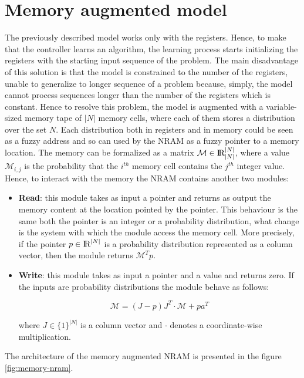 \section{Memory augmented model}\label{sec:nram-memory}
The previously described model works only with the registers. Hence, to make that the controller learns an algorithm, the learning process starts initializing the registers with the starting input sequence of the problem. The main disadvantage of this solution is that the model is constrained to the number of the registers, unable to generalize to longer sequence of a problem because, simply, the model cannot process sequences longer than the number of the registers which is constant.\newline\newline
Hence to resolve this problem, the model is augmented with a variable-sized memory tape of $|N|$ memory cells, where each of them stores a distribution over the set $N$. Each distribution both in registers and in memory could be seen as a fuzzy address and so can used by the NRAM as a fuzzy pointer to a memory location. The memory can be formalized as a matrix $\mathcal{M} \in \textrm{I\!R}_{|N|}^{|N|}$, where a value $\mathcal{M}_{i,j}$ is the probability that the $i^{th}$ memory cell contains the $j^{th}$ integer value.\newline\newline
Hence, to interact with the memory the NRAM contains another two modules:
\begin{itemize}
	\item{\textbf{Read}: this module takes as input a pointer and returns as output the memory content at the location pointed by the pointer. This behaviour is the same both the pointer is an integer or a probability distribution, what change is the system with which the module access the memory cell. More precisely, if the pointer $p\in\textrm{I\!R}^{|N|}$ is a probability distribution represented as a column vector, then the module returns $\mathcal{M}^{T}p$.}
	\item{\textbf{Write}: this module takes as input a pointer and a value and returns zero. If the inputs are probability distributions the module behave as follows:
\begin{center}
	\begin{equation}
	\mathcal{M} = (J - p)J^{T} \cdot \mathcal{M} + pa^{T}
	\end{equation}
\end{center}	
where $J \in \{1\}^{|N|}$ is a column vector and $\cdot$ denotes a coordinate-wise multiplication.}
\end{itemize}
The architecture of the memory augmented NRAM is presented in the figure \ref{fig:memory-nram}.

